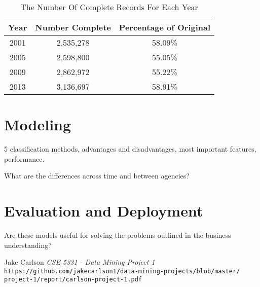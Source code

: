 \documentclass{article}
\begin{document}
    \begin{center}
        \begin{table}
            \centering
            \begin{tabular}{ |c|c|c| }
                \hline
                Year & Number Complete & Percentage of Original \\
                \hline
                2001 & 2,535,278 & 58.09\% \\
                2005 & 2,598,800 & 55.05\% \\
                2009 & 2,862,972 & 55.22\% \\
                2013 & 3,136,697 & 58.91\% \\
                \hline
            \end{tabular}
            \caption{The Number Of Complete Records For Each Year}
            \label{tab:5}
        \end{table}
    \end{center}


\section{Modeling}
5 classification methods, advantages and disadvantages, most important features, performance.

What are the differences across time and between agencies?

\section{Evaluation and Deployment}
Are these models useful for solving the problems outlined in the business understanding?

\begin{thebibliography}{10}
    Jake Carlson
    \textit{CSE 5331 - Data Mining Project 1}
    \texttt{https://github.com/jakecarlson1/data-mining-projects/blob/master/}
    \texttt{project-1/report/carlson-project-1.pdf}

\end{thebibliography}
\end{document}
